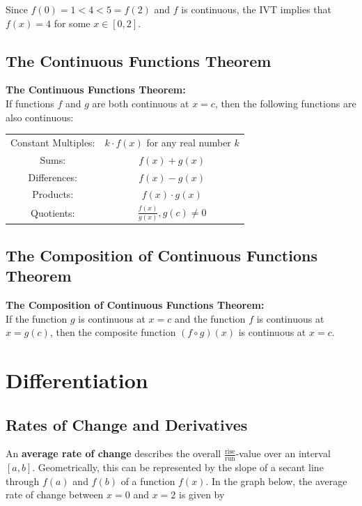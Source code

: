 \documentclass{article}
\begin{document}
            \noindent Since $f(0)=1<4<5=f(2)$ and $f$ is continuous, the IVT implies that $f(x)=4$
            for some $x\in[0,2]$.


        \subsection{The Continuous Functions Theorem}
            \color{purple} \textbf{The Continuous Functions Theorem:} \color{black} \\
            If functions $f$ and $g$ are both continuous at $x=c$, then the following functions are
            also continuous: \\

            \begin{tabular}{cc}
                Constant Multiples: & $k\cdot f(x)$ for any real number $k$ \\
                Sums: & $f(x)+g(x)$ \\
                Differences: & $f(x)-g(x)$ \\
                Products: & $f(x)\cdot g(x)$ \\
                Quotients: & $\frac{f(x)}{g(x)}, g(c)\not=0$
            \end{tabular}


        \subsection{The Composition of Continuous Functions Theorem}
            \color{purple} \textbf{The Composition of Continuous Functions Theorem:} \color{black} \\
            If the function $g$ is continuous at $x=c$ and the function $f$ is continuous at $x=g(c)$,
            then the composite function $(f\circ g)(x)$ is continuous at $x=c$.

    \pagebreak

    \section{Differentiation}

        \subsection{Rates of Change and Derivatives}
            An \textbf{average rate of change} describes the overall
            $\frac{\text{rise}}{\text{run}}$-value over an interval $[a,b]$. Geometrically,
            this can be represented by the slope of a secant line through $f(a)$ and $f(b)$ of a
            function $f(x)$. In the graph below, the average rate of change between $x=0$ and
            $x=2$ is given by \\
\end{document}
